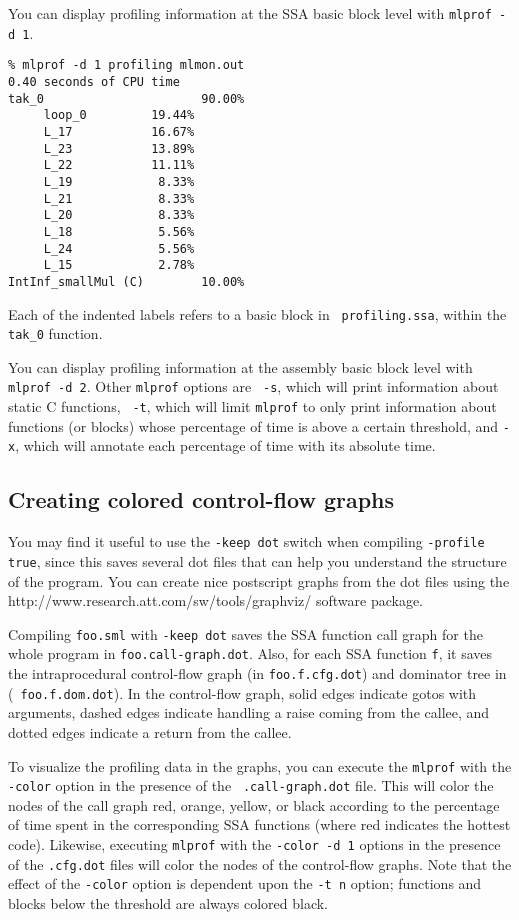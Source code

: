 You can display profiling information at the SSA basic block level
with {\tt mlprof -d 1}.

\begin{verbatim}
% mlprof -d 1 profiling mlmon.out
0.40 seconds of CPU time
tak_0                      90.00%
     loop_0         19.44%       
     L_17           16.67%       
     L_23           13.89%       
     L_22           11.11%       
     L_19            8.33%       
     L_21            8.33%       
     L_20            8.33%       
     L_18            5.56%       
     L_24            5.56%       
     L_15            2.78%       
IntInf_smallMul (C)        10.00%
\end{verbatim}
Each of the indented labels refers to a basic block in {\tt
  profiling.ssa}, within the {\tt tak\_0} function.

You can display profiling information at the assembly basic block
level with {\tt mlprof -d 2}.  Other {\tt mlprof} options are {\tt
  -s}, which will print information about static C functions, {\tt
  -t}, which will limit {\tt mlprof} to only print information about
functions (or blocks) whose percentage of time is above a certain
threshold, and {\tt -x}, which will annotate each percentage of time
with its absolute time.

\subsection{Creating colored control-flow graphs}

You may find it useful to use the {\tt -keep dot} switch when
compiling {\tt -profile true}, since this saves several dot files that
can help you understand the structure of the program.  You can create
nice postscript graphs from the dot files using the
		  {http://www.research.att.com/sw/tools/graphviz/}
software package.

Compiling {\tt foo.sml} with {\tt -keep dot} saves the SSA function
call graph for the whole program in {\tt foo.call-graph.dot}.  Also,
for each SSA function {\tt f}, it saves the intraprocedural
control-flow graph (in {\tt foo.f.cfg.dot}) and dominator tree in ({\tt
foo.f.dom.dot}).  In the control-flow graph, solid edges indicate
gotos with arguments, dashed edges indicate handling a raise coming
from the callee, and dotted edges indicate a return from the callee.

To visualize the profiling data in the graphs, you can execute the
{\tt mlprof} with the {\tt -color} option in the presence of the {\tt
.call-graph.dot} file.  This will color the nodes of the call graph
red, orange, yellow, or black according to the percentage of time
spent in the corresponding SSA functions (where red indicates the
hottest code).  Likewise, executing {\tt mlprof} with the {\tt -color
-d 1} options in the presence of the {\tt .cfg.dot} files will color
the nodes of the control-flow graphs.  Note that the effect of the
{\tt -color} option is dependent upon the {\tt -t n} option; functions
and blocks below the threshold are always colored black.

